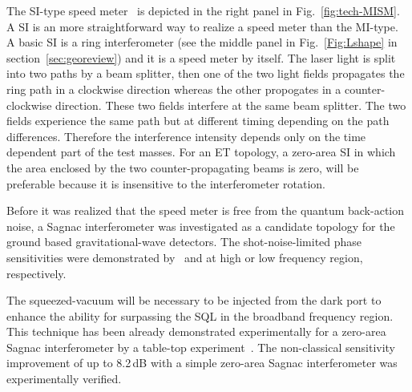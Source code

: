The SI-type speed meter~\cite{Chen2003} is depicted in the right panel in Fig.~\ref{fig:tech-MISM}.
A SI is an more straightforward way to realize a speed meter than the MI-type.
A basic SI is a ring interferometer (see the middle panel in Fig.~\ref{Fig:Lshape}
in section~\ref{sec:georeview}) and it is a speed meter by itself.
The laser light is split into two paths by a beam splitter,
then one of the two light fields propagates the ring path in a clockwise direction
whereas the other propogates in a counter-clockwise direction. These two fields interfere at the same beam splitter.
The two fields experience the same path but at different timing depending on the path differences.
Therefore the interference intensity depends only on the time dependent part of the test masses.
For an ET topology, a zero-area SI in which the area enclosed by the two
counter-propagating beams is zero, will be preferable
because it is insensitive to the interferometer rotation.

Before it was realized that the speed meter is free from the quantum back-action noise,
a Sagnac interferometer was investigated
as a candidate topology for the ground based gravitational-wave detectors.
The shot-noise-limited phase sensitivities were demonstrated
by~\cite{Sun1996} and \cite{Beyersdorf02} at high or low frequency region, respectively.

The squeezed-vacuum will be necessary to be injected from the dark port
to enhance the ability for surpassing the SQL in the broadband frequency region.
This technique has been already demonstrated experimentally
for a zero-area Sagnac interferometer by a table-top experiment~\cite{Eberle2010}.
The non-classical sensitivity improvement of up to 8.2\,dB with
a simple zero-area Sagnac interferometer was experimentally verified.


